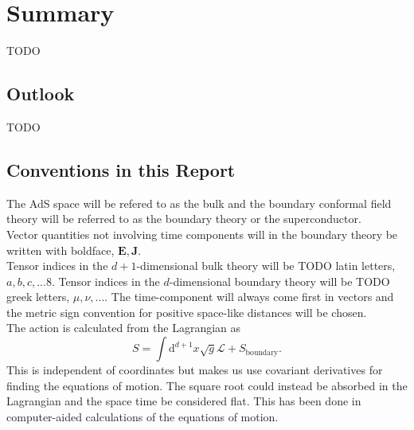 \documentclass[12pt]{report}
\renewcommand{\d}{\ensuremath{\mathrm{d}}}
\renewcommand{\L}{\ensuremath{\mathcal{L}}}
\begin{document}
\chapter{Summary}
TODO
\section{Outlook}
TODO

\begin{appendices}
\section{Conventions in this Report\label{conventions}}
The AdS space will be refered to as the bulk and the boundary conformal field theory will be referred to as the boundary theory or the superconductor.\\
Vector quantities not involving time components will in the boundary theory be written with boldface, $\mathbf{E}, \mathbf{J}$.\\
Tensor indices in the $d+1$-dimensional bulk theory will be TODO latin letters, $a,b,c,...8$. Tensor indices in the $d$-dimensional boundary theory will be TODO greek letters, $\mu,\nu,...$.
The time-component will always come first in vectors and the metric sign convention for positive space-like distances will be chosen.\\
The action is calculated from the Lagrangian as
\begin{equation}
 S=\int\d^{d+1} x\sqrt{g}\L+S_\mathrm{boundary}.
\end{equation}
This is independent of coordinates but makes us use covariant derivatives for finding the equations of motion. The square root could instead be absorbed in the Lagrangian and the space time be considered flat. This has been done in computer-aided calculations of the equations of motion.
\end{appendices}


\end{document}

